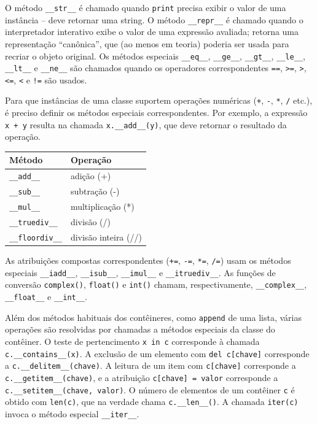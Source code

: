 \documentclass[11pt,a4paper]{article}
\begin{document}
O método \texttt{\_\_str\_\_} é chamado quando \texttt{print} precisa
exibir o valor de uma instância -- deve retornar uma string. O método
\texttt{\_\_repr\_\_} é chamado quando o interpretador interativo exibe o
valor de uma expressão avaliada; retorna uma representação ``canônica'',
que (ao menos em teoria) poderia ser usada para recriar o objeto
original. Os métodos especiais \texttt{\_\_eq\_\_}, \texttt{\_\_ge\_\_},
\texttt{\_\_gt\_\_}, \texttt{\_\_le\_\_}, \texttt{\_\_lt\_\_} e
\texttt{\_\_ne\_\_} são chamados quando os operadores correspondentes
\texttt{==}, \texttt{>=}, \texttt{>}, \texttt{<=}, \texttt{<} e
\texttt{!=} são usados.

Para que instâncias de uma classe suportem operações numéricas (\texttt{+},
\texttt{-}, \texttt{*}, \texttt{/} etc.), é preciso definir os métodos
especiais correspondentes. Por exemplo, a expressão \texttt{x + y}
resulta na chamada \texttt{x.\_\_add\_\_(y)}, que deve retornar o
resultado da operação.

\begin{center}
\begin{tabular}{ll}
\toprule
\textbf{Método} & \textbf{Operação} \\
\midrule
\texttt{\_\_add\_\_} & adição (+) \\
\texttt{\_\_sub\_\_} & subtração (-) \\
\texttt{\_\_mul\_\_} & multiplicação (*) \\
\texttt{\_\_truediv\_\_} & divisão (/) \\
\texttt{\_\_floordiv\_\_} & divisão inteira (//) \\
\bottomrule
\end{tabular}
\end{center}

As atribuições compostas correspondentes (\texttt{+=}, \texttt{-=},
\texttt{*=}, \texttt{/=}) usam os métodos especiais \texttt{\_\_iadd\_\_},
\texttt{\_\_isub\_\_}, \texttt{\_\_imul\_\_} e \texttt{\_\_itruediv\_\_}.
As funções de conversão \texttt{complex()}, \texttt{float()} e
\texttt{int()} chamam, respectivamente, \texttt{\_\_complex\_\_},
\texttt{\_\_float\_\_} e \texttt{\_\_int\_\_}.

Além dos métodos habituais dos contêineres, como \texttt{append} de uma
lista, várias operações são resolvidas por chamadas a métodos especiais
da classe do contêiner. O teste de pertencimento \texttt{x in c}
corresponde à chamada \texttt{c.\_\_contains\_\_(x)}. A exclusão de um
elemento com \texttt{del c[chave]} corresponde a
\texttt{c.\_\_delitem\_\_(chave)}. A leitura de um item com
\texttt{c[chave]} corresponde a \texttt{c.\_\_getitem\_\_(chave)}, e a
atribuição \texttt{c[chave] = valor} corresponde a
\texttt{c.\_\_setitem\_\_(chave, valor)}. O número de elementos de um
contêiner \texttt{c} é obtido com \texttt{len(c)}, que na verdade chama
\texttt{c.\_\_len\_\_()}. A chamada \texttt{iter(c)} invoca o método
especial \texttt{\_\_iter\_\_}.
\end{document}
